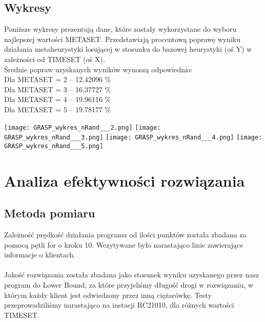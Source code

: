 \documentclass[a4paper]{article}
\begin{document}
\subsection{Wykresy}
Poniższe wykresy prezentują dane, które zostały wykorzystane do wyboru najlepszej wartości METASET. Przedstawiają procentową poprawę wyniku działania metaheurystyki losującej w stosunku do bazowej heurystyki  (oś Y) w zależności od TIMESET (oś X).\\
Średnie popraw uzyskanych wyników wynoszą odpowiednio:\\
Dla METASET = 2  	--	12.42096 \%\\
Dla METASET = 3 	--	16.37727 \%\\	
Dla METASET = 4 	--	19.96116 \%\\	
Dla METASET = 5 	--	19.78177 \%\\

\begin{center}
\texttt{[image: GRASP\_wykres\_nRand\_\_\_2.png]}
\texttt{[image: GRASP\_wykres\_nRand\_\_\_3.png]}
\texttt{[image: GRASP\_wykres\_nRand\_\_\_4.png]}
\texttt{[image: GRASP\_wykres\_nRand\_\_\_5.png]}
\end{center}

\newpage
\section{Analiza efektywności rozwiązania}
\subsection{Metoda pomiaru}
Zależność prędkość działania programu od ilości punktów została zbadana za pomocą  pętli for o kroku 10. Wczytywane było narastająco linie zawierające informacje o klientach. \\
\\
Jakość rozwiązania została zbadana jako stosunek wyniku uzyskanego przez nasz program do Lower Bound, za które przyjeliśmy długość drogi w rozwiązaniu, w którym każdy klient jest odwiedzony przez inną ciężarówkę. Testy przeprowadziliśmy narastająco na instacji RC21010, dla różnych wartości TIMESET.

\end{document}
